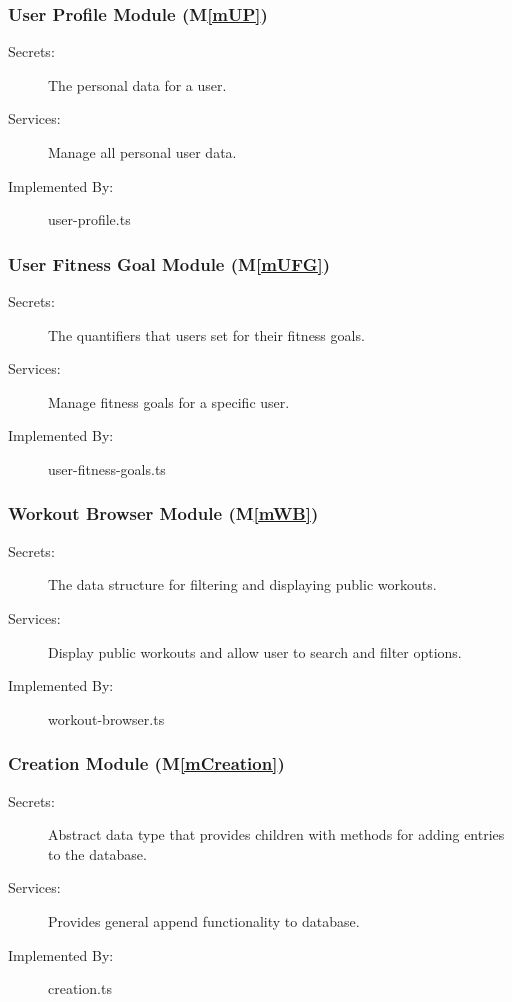 \documentclass[12pt, titlepage]{article}
\newcommand{\mref}[1]{M\ref{#1}}
\begin{document}
\subsubsection{User Profile Module (\mref{mUP})}

\begin{description}
\item[Secrets:] The personal data for a user.
\item[Services:] Manage all personal user data.
\item[Implemented By:] user-profile.ts
\end{description}

\subsubsection{User Fitness Goal Module (\mref{mUFG})}

\begin{description}
\item[Secrets:] The quantifiers that users set for their fitness goals.
\item[Services:] Manage fitness goals for a specific user.
\item[Implemented By:] user-fitness-goals.ts
\end{description}

\subsubsection{Workout Browser Module (\mref{mWB})}

\begin{description}
\item[Secrets:] The data structure for filtering and displaying public workouts.
\item[Services:] Display public workouts and allow user to search and filter options.
\item[Implemented By:] workout-browser.ts
\end{description}

\subsubsection{Creation Module (\mref{mCreation})}

\begin{description}
\item[Secrets:] Abstract data type that provides children with methods for adding entries to the database.
\item[Services:] Provides general append functionality to database.
\item[Implemented By:] creation.ts
\end{description}
\end{document}
